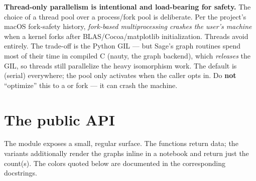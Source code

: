 \begin{gotcha}
\label{gotcha:threads}
\textbf{Thread-only parallelism is intentional and load-bearing for safety.} The
choice of a thread pool over a process/fork pool is deliberate. Per the project's
macOS fork-safety history, \emph{fork-based multiprocessing crashes the user's
machine} when a kernel forks after BLAS/Cocoa/matplotlib initialization. Threads
avoid  entirely. The trade-off is the Python GIL --- but Sage's graph
routines spend most of their time in compiled C (nauty, the graph backend), which
\emph{releases} the GIL, so threads still parallelize the heavy isomorphism work.
The default is  (serial) everywhere; the pool only activates
when the caller opts in. Do \textbf{not} ``optimize'' this to a
 or fork --- it can crash the machine.
\end{gotcha}

\section{The public API}
\label{sec:api}

The module exposes a small, regular surface. The  functions
return data; the  variants additionally render the graphs inline in
a notebook and return just the count(s). The colors quoted below are documented in
the corresponding  docstrings.

